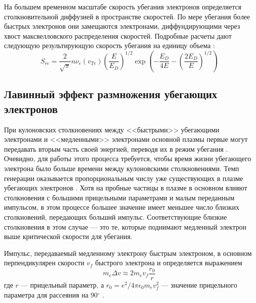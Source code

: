 На большем временном масштабе скорость убегания электронов определяется столкновительной диффузией в пространстве скоростей. По мере убегания более быстрых электронов они замещаются электронами, диффундирующими через хвост максвелловского распределения скоростей. Подробные расчеты дают следующую результирующую скорость убегания на единицу объема \cite{Wesson2004}: 
\begin{equation*}
  S_{re} = \frac{2}{ \sqrt{\pi} } n \nu_{e}(v_{Te}) \left( \frac{E}{E_D} \right)^{1/2} \exp\left( -\frac{E_D}{4 E} - \left( \frac{2 E_D }{E} \right)^{1/2} \right)
\end{equation*}



\subsection{Лавинный эффект размножения убегающих электронов}

При кулоновских столкновениях между <<быстрыми>> убегающими электронами и <<медленными>> электронами основной плазмы первые могут передавать вторым часть своей энергией, переводя их в режим убегания \cite{Sokolov1979}. Очевидно, для работы этого процесса требуется, чтобы время жизни убегающего электрона было больше времени между кулоновскими столкновениями. Темп генерации оказывается пропорциональным числу уже существующих в плазме убегающих электронов \cite{Rozansky2012}.  Хотя на пробные частицы в плазме в основном влияют столкновения с большими прицельными параметрами и малым переданным импульсом, в этом процессе большее значение имеет меньшее число близких столкновений, передающих больший импульс. Соответствующие близкие столкновения в этом случае --- это те, которые поднимают медленный электрон выше критической скорости для убегания. 

Импульс, передаваемый медленному электрону быстрым электроном, в основном перпендикулярен скорости $v_f$ быстрого электрона и определяется выражением
\begin{equation*}
  m_e \Delta v \approx 2 m_e v_f \frac{r_0}{r}
\end{equation*}
где $r$ --- прицельный параметр, а $r_0 = e^2 / 4 \pi \epsilon_0 m_e v_f^2$ --- значение прицельного параметра для рассеяния на 90$^\circ$ \cite{Wesson2004}. 

